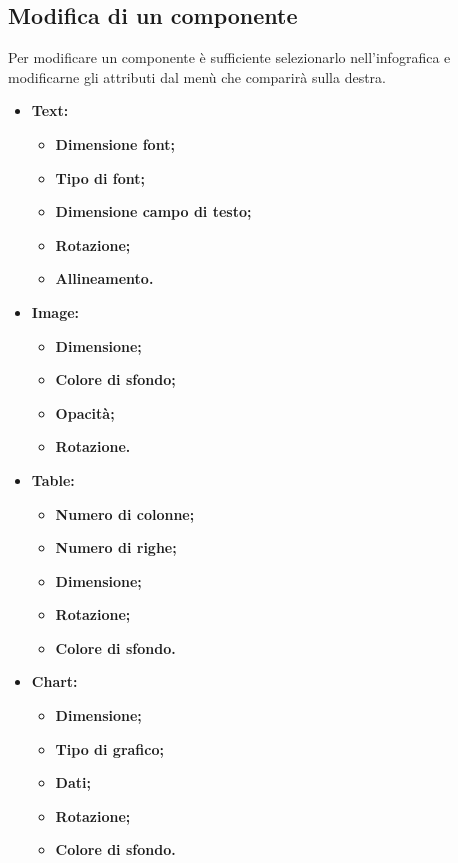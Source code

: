 \subsection{Modifica di un componente}
Per modificare un componente è sufficiente selezionarlo nell'infografica e modificarne gli attributi dal menù che comparirà sulla destra.
\begin{itemize}

	\item \textbf{Text:}
		\begin{itemize}
			\item \textbf{Dimensione font;}
			\item \textbf{Tipo di font;}
			\item \textbf{Dimensione campo di testo;}
			\item \textbf{Rotazione;}
			\item \textbf{Allineamento.}
		\end{itemize}
	
	\item \textbf{Image:}
		\begin{itemize}
			\item \textbf{Dimensione;}
			\item \textbf{Colore di sfondo;}
			\item \textbf{Opacità;}
			\item \textbf{Rotazione.}
		\end{itemize}

	\item \textbf{Table:}
		\begin{itemize}
			\item \textbf{Numero di colonne;}
			\item \textbf{Numero di righe;}
			\item \textbf{Dimensione;}
			\item \textbf{Rotazione;}
			\item \textbf{Colore di sfondo.}
		\end{itemize}
		
	\item \textbf{Chart:}
		\begin{itemize}
			\item \textbf{Dimensione;}
			\item \textbf{Tipo di grafico;}
			\item \textbf{Dati;}
			\item \textbf{Rotazione;}
			\item \textbf{Colore di sfondo.}
		\end{itemize}
	

\end{itemize}
